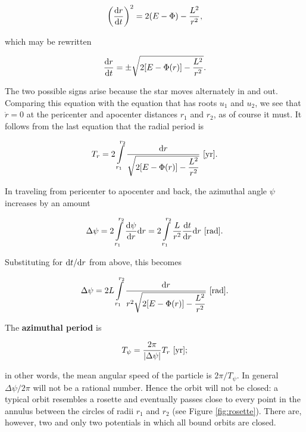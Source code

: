 \documentclass[a4paper,10pt]{article}
\begin{document}
\begin{align*}
    \left(\frac{{\rm d}r}{{\rm d}t}\right)^2 = 2(E-\Phi) - \frac{L^2}{r^2},
\end{align*}

{\noindent}which may be rewritten

\begin{align*}
    \frac{{\rm d}r}{{\rm d}t} = \pm\sqrt{2[E-\Phi(r)]-\frac{L^2}{r^2}}.
\end{align*}

{\noindent}The two possible signs arise because the star moves alternately in and out. Comparing this equation with the equation that has roots $u_1$ and $u_2$, we see that $\dot{r}=0$ at the pericenter and apocenter distances $r_1$ and $r_2$, as of course it must. It follows from the last equation that the radial period is

\begin{align*}
    T_r = 2\int\limits_{r_1}^{r_2} \frac{{\rm d}r}{\sqrt{2[E-\Phi(r)]-\dfrac{L^2}{r^2}}} ~ [{\rm yr}].
\end{align*}

{\noindent}In traveling from pericenter to apocenter and back, the azimuthal angle $\psi$ increases by an amount

\begin{align*}
    \Delta\psi = 2\int\limits_{r_1}^{r_2}\frac{{\rm d}\psi}{{\rm d}r}{\rm d}r = 2\int\limits_{r_1}^{r_2} \frac{L}{r^2}\frac{{\rm d}t}{{\rm d}r}{\rm d}r ~ [{\rm rad}].
\end{align*}

{\noindent}Substituting for ${\rm d}t/{\rm d}r$ from above, this becomes

\begin{align*}
    \Delta\psi = 2L\int\limits_{r_1}^{r_2} \frac{{\rm d}r}{r^2\sqrt{2[E-\Phi(r)]-\dfrac{L^2}{r^2}}} ~ [{\rm rad}].
\end{align*}

{\noindent}The \textbf{azimuthal period} is

\begin{align*}
    T_\psi = \frac{2\pi}{\lvert\Delta\psi\rvert}T_r ~ [{\rm yr}];
\end{align*}

{\noindent}in other words, the mean angular speed of the particle is $2\pi/T_\psi$. In general $\Delta\psi/2\pi$ will not be a rational number. Hence the orbit will not be closed: a typical orbit resembles a rosette and eventually passes close to every point in the annulus between the circles of radii $r_1$ and $r_2$ (see Figure \ref{fig:rosette}). There are, however, two and only two potentials in which all bound orbits are closed.
\end{document}
